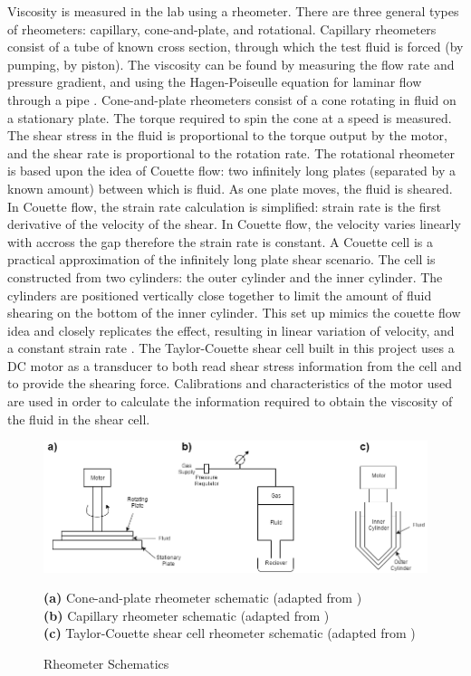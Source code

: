\documentclass[twoside,a4]{report}
\def\br{\newline \newline \noindent}
\begin{document}
	\noindent
	Viscosity is measured in the lab using a rheometer. There are three general types of rheometers: capillary, cone-and-plate, and rotational. Capillary rheometers consist of a tube of known cross section, through which the test fluid is forced (by pumping, by piston). The viscosity can be found by measuring the flow rate and pressure gradient, and using the Hagen-Poiseulle equation for laminar flow through a pipe \cite{backcaprheom}. Cone-and-plate rheometers consist of a cone rotating in fluid on a stationary plate. The torque required to spin the cone at a speed is measured. The shear stress in the fluid is proportional to the torque output by the motor, and the shear rate is proportional to the rotation rate. 
	\br
	The rotational rheometer is based upon the idea of Couette flow: two infinitely long plates (separated by a known amount) between which is fluid. As one plate moves, the fluid is sheared. In Couette flow, the strain rate calculation is simplified: strain rate is the first derivative of the velocity of the shear. In Couette flow, the velocity varies linearly with accross the gap therefore the strain rate is constant. A Couette cell is a practical approximation of the infinitely long plate shear scenario. The cell is constructed from two cylinders: the outer cylinder and the inner cylinder. The cylinders are positioned vertically close together to limit the amount of fluid shearing on the bottom of the inner cylinder. This set up mimics the couette flow idea and closely replicates the effect, resulting in linear variation of velocity, and a constant strain rate \cite{couetteshearcell}.
	\br
	The Taylor-Couette shear cell built in this project uses a DC motor as a transducer to both read shear stress information from the cell and to provide the shearing force. Calibrations and characteristics of the motor used are used in order to calculate the information required to obtain the viscosity of the fluid in the shear cell.
	\begin{figure}[!htb]
		\centering
		\includegraphics[scale=0.45]{images/capschem.png}
		\caption{Rheometer Schematics}
		\label{figrheomschem}
		\footnotesize 
		\textbf{(a)} Cone-and-plate rheometer schematic (adapted from \cite{tadhrbrochure})\\
		\textbf{(b)} Capillary rheometer schematic (adapted from \cite{figcapschem})\\
		\textbf{(c)} Taylor-Couette shear cell rheometer schematic (adapted from \cite{couetteshearcell})
	\end{figure}
	
\end{document}
